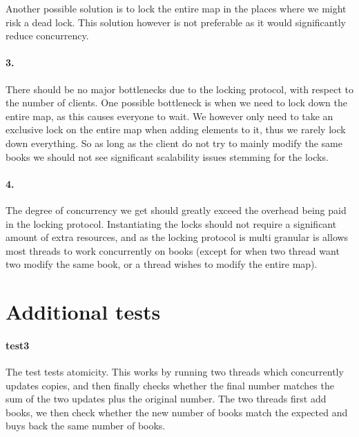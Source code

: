 \documentclass[a4paper, 11pt]{article}
\begin{document}
Another possible solution is to lock the entire map in the places where we might risk a dead lock. This solution however is not preferable as it would significantly reduce concurrency.


\paragraph{3.} %
\label{par:3_}

There should be no major bottlenecks due to the locking protocol, with respect to the number of clients. One possible bottleneck is when we need to lock down the entire map, as this causes everyone to wait. We however only need to take an exclusive lock on the entire map when adding elements to it, thus we rarely lock down everything. So as long as the client do not try to mainly modify the same books we should not see significant scalability issues stemming for the locks.


\paragraph{4.} %
\label{par:4_}

The degree of concurrency we get should greatly exceed the overhead being paid in the locking protocol. Instantiating the locks should not require a significant amount of extra resources, and as the locking protocol is multi granular is allows most threads to work concurrently on books (except for when two thread want two modify the same book, or a thread wishes to modify the entire map).



\section{Additional tests} %
\label{sec:additional_tests}

\paragraph{test3} %
\label{par:test3}

The test tests atomicity. This works by running two threads which concurrently updates copies, and then finally checks whether the final number matches the sum of the two updates plus the original number. The two threads first add books, we then check whether the new number of books match the expected and buys back the same number of books.
\end{document}

